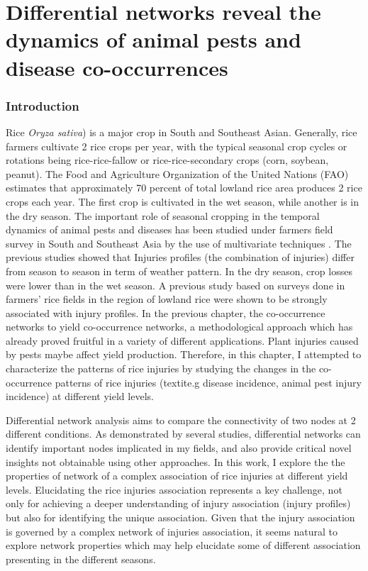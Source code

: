 \chapter{Differential networks reveal the dynamics of animal pests and disease co-occurrences}

\subsection{Introduction}
Rice \textit{Oryza sativa}) is a major crop in South and Southeast Asian. Generally, rice farmers cultivate 2 rice crops per year, with the typical seasonal crop cycles or rotations being rice-rice-fallow or rice-rice-secondary crops (corn, soybean, peanut). The Food and Agriculture Organization of the United Nations (FAO) estimates that approximately 70 percent of total lowland rice area produces 2 rice crops each year. The first crop is cultivated in the wet season, while another is in the dry season. The important role of seasonal cropping in the temporal dynamics of animal pests and diseases has been studied under farmers field survey in South and Southeast Asia by the use of multivariate techniques \citet{Savary_2000_Characterization, Willocquet_2008_Simulating}. The previous studies showed that Injuries profiles (the combination of injuries) differ from season to season in term of weather pattern. In the dry season, crop losses were lower than in the wet season. A previous study based on surveys done in farmers’ rice fields in the region of lowland rice were shown to be strongly associated with injury profiles.
In the previous chapter, the co-occurrence networks to yield co-occurrence networks, a methodological approach which has already proved fruitful in a variety of different applications.  Plant injuries caused by pests maybe affect yield production. Therefore, in this chapter, I attempted to characterize the patterns of rice injuries by studying the changes in the co-occurrence patterns of rice injuries (textit{e.g} disease incidence, animal pest injury incidence) at different yield levels.


Differential network analysis aims to compare the connectivity of two nodes at 2 different conditions. As demonstrated by several studies, differential networks can identify important nodes implicated in my fields, and also provide critical novel insights not obtainable using other approaches. In this work, I explore the the properties of network of a complex association of rice injuries at different yield levels. Elucidating the rice injuries association represents a key challenge, not only for achieving a deeper understanding of injury association (injury profiles) but also for identifying the unique association. Given that the injury association is governed by a complex network of injuries association, it seems natural to explore network properties which may help elucidate some of different association presenting in the different seasons.


